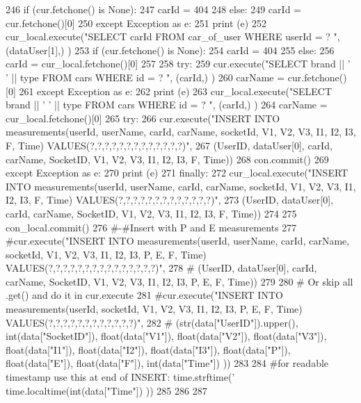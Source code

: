 \begin{DoxyCode}
246         \textcolor{keywordflow}{if} (cur.fetchone() \textcolor{keywordflow}{is} \textcolor{keywordtype}{None}):
247             carId = 404
248         \textcolor{keywordflow}{else}:
249             carId = cur.fetchone()[0]        
250     \textcolor{keywordflow}{except} Exception \textcolor{keyword}{as} e:
251         \textcolor{keywordflow}{print} (e)
252         cur\_local.execute(\textcolor{stringliteral}{"SELECT carId FROM car\_of\_user WHERE userId = ? "}, (dataUser[1],) )
253         \textcolor{keywordflow}{if} (cur.fetchone() \textcolor{keywordflow}{is} \textcolor{keywordtype}{None}):
254             carId = 404
255         \textcolor{keywordflow}{else}:
256             carId = cur\_local.fetchone()[0]
257     
258     \textcolor{keywordflow}{try}:
259         cur.execute(\textcolor{stringliteral}{"SELECT brand || ' ' || type FROM cars WHERE id = ? "}, (carId,) )
260         carName = cur.fetchone()[0]
261     \textcolor{keywordflow}{except} Exception \textcolor{keyword}{as} e:
262         \textcolor{keywordflow}{print} (e)
263         cur\_local.execute(\textcolor{stringliteral}{"SELECT brand || ' ' || type FROM cars WHERE id = ? "}, (carId,) )
264         carName = cur\_local.fetchone()[0]
265     \textcolor{keywordflow}{try}:    
266         cur.execute(\textcolor{stringliteral}{"INSERT INTO measurements(userId, userName, carId, carName, socketId, V1, V2, V3, I1,
       I2, I3, F, Time) VALUES(?,?,?,?,?,?,?,?,?,?,?,?,?)"},
267                     (UserID, dataUser[0], carId, carName, SocketID, V1, V2, V3, I1, I2, I3, F, Time))
268         con.commit()
269     \textcolor{keywordflow}{except} Exception \textcolor{keyword}{as} e:
270         \textcolor{keywordflow}{print} (e)
271     \textcolor{keywordflow}{finally}:
272         cur\_local.execute(\textcolor{stringliteral}{"INSERT INTO measurements(userId, userName, carId, carName, socketId, V1, V2, V3,
       I1, I2, I3, F, Time) VALUES(?,?,?,?,?,?,?,?,?,?,?,?,?)"},
273                 (UserID, dataUser[0], carId, carName, SocketID, V1, V2, V3, I1, I2, I3, F, Time))
274     
275     con\_local.commit()
276     \textcolor{comment}{#-#Insert with P and E measurements}
277     \textcolor{comment}{#cur.execute("INSERT INTO measurements(userId, userName, carId, carName, socketId, V1, V2, V3, I1, I2,
       I3, P, E, F, Time) VALUES(?,?,?,?,?,?,?,?,?,?,?,?,?,?,?)",}
278     \textcolor{comment}{#            (UserID, dataUser[0], carId, carName, SocketID, V1, V2, V3, I1, I2, I3, P, E, F, Time))}
279     
280     \textcolor{comment}{# Or skip all .get() and do it in cur.execute     }
281     \textcolor{comment}{#cur.execute("INSERT INTO measurements(userId, socketId, V1, V2, V3, I1, I2, I3, P, E, F, Time)
       VALUES(?,?,?,?,?,?,?,?,?,?,?,?)",}
282     \textcolor{comment}{#            (str(data["UserID"]).upper(), int(data["SocketID"]), float(data["V1"]), float(data["V2"]),
       float(data["V3"]), float(data["I1"]), float(data["I2"]), float(data["I3"]), float(data["P"]),
       float(data["E"]), float(data["F"]), int(data["Time"]) ))}
283     
284    \textcolor{comment}{#for readable timestamp use this at end of INSERT: time.strftime('%
       time.localtime(int(data["Time"]) ))}
285     
286     
287 
\end{DoxyCode}

